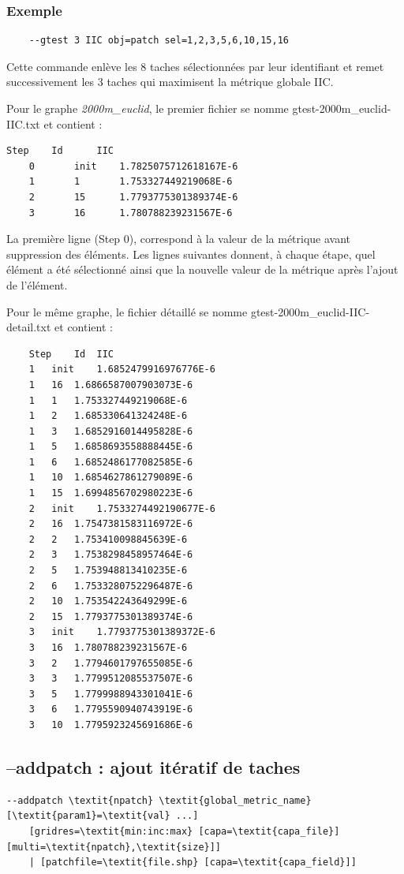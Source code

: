 \documentclass[a4paper,10pt]{report}
\begin{document}
\subsubsection{Exemple}

\begin{Verbatim}
	--gtest 3 IIC obj=patch sel=1,2,3,5,6,10,15,16
\end{Verbatim}

Cette commande enlève les 8 taches sélectionnées par leur identifiant et remet successivement les 3 taches qui maximisent la métrique globale IIC.

Pour le graphe \textit{2000m\_euclid}, le premier fichier se nomme gtest-2000m\_euclid-IIC.txt et contient :
\begin{Verbatim}[tabsize=4]
	Step	Id		IIC
	0		init	1.7825075712618167E-6
	1		1		1.753327449219068E-6
	2		15		1.7793775301389374E-6
	3		16		1.780788239231567E-6
\end{Verbatim}
La première ligne (Step 0), correspond à la valeur de la métrique avant suppression des éléments. Les lignes suivantes donnent, à chaque étape, quel élément a été sélectionné ainsi que la nouvelle valeur de la métrique après l'ajout de l'élément.

Pour le même graphe, le fichier détaillé se nomme gtest-2000m\_euclid-IIC-detail.txt et contient :
\begin{Verbatim}
	Step	Id	IIC
	1	init	1.6852479916976776E-6
	1	16	1.6866587007903073E-6
	1	1	1.753327449219068E-6
	1	2	1.685330641324248E-6
	1	3	1.6852916014495828E-6
	1	5	1.6858693558888445E-6
	1	6	1.6852486177082585E-6
	1	10	1.6854627861279089E-6
	1	15	1.6994856702980223E-6
	2	init	1.7533274492190677E-6
	2	16	1.7547381583116972E-6
	2	2	1.753410098845639E-6
	2	3	1.7538298458957464E-6
	2	5	1.753948813410235E-6
	2	6	1.7533280752296487E-6
	2	10	1.753542243649299E-6
	2	15	1.7793775301389374E-6
	3	init	1.7793775301389372E-6
	3	16	1.780788239231567E-6
	3	2	1.7794601797655085E-6
	3	3	1.7799512085537507E-6
	3	5	1.7799988943301041E-6
	3	6	1.7795590940743919E-6
	3	10	1.7795923245691686E-6
\end{Verbatim}


\subsection{--addpatch : ajout itératif de taches}
\begin{Verbatim}[commandchars=\\\{\}]
--addpatch \textit{npatch} \textit{global_metric_name} [\textit{param1}=\textit{val} ...]
	[gridres=\textit{min:inc:max} [capa=\textit{capa_file}] [multi=\textit{npatch},\textit{size}]]
	| [patchfile=\textit{file.shp} [capa=\textit{capa_field}]]
\end{Verbatim}
\end{document}
